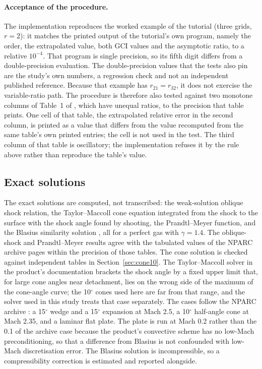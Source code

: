 \documentclass[11pt,a4paper]{article}
\begin{document}
\paragraph{Acceptance of the procedure.}
The implementation reproduces the worked example of the tutorial \citep{nparc_spatial}
(three grids, $r=2$): it matches the printed output of the tutorial's own program, namely the order, the
extrapolated value, both GCI values and the asymptotic ratio, to a relative $10^{-4}$.
That program is single precision, so its fifth digit differs from a double-precision evaluation.
The double-precision values that the tests also pin are the study's own numbers, a regression check and not an
independent published reference.
Because that example has $r_{21}=r_{32}$, it does not exercise the variable-ratio path.
The procedure is therefore also tested against two monotone columns of Table~1 of \citet{celik2008}, which
have unequal ratios, to the precision that table prints.
One cell of that table, the extrapolated relative error in the second column, is printed as a value that
differs from the value recomputed from the same table's own printed entries; the cell is not used in the test.
The third column of that table is oscillatory; the implementation refuses it by the rule above rather than
reproduce the table's value.

\subsection{Exact solutions}
\label{sec:exact}

The exact solutions are computed, not transcribed: the weak-solution oblique shock relation, the
Taylor--Maccoll cone equation integrated from the shock to the surface with the shock angle found by shooting,
the Prandtl--Meyer function, and the Blasius similarity solution \citep{blasius1908,schlichting2017},
all for a perfect gas with $\gamma=1.4$.
The oblique-shock and Prandtl--Meyer results agree with the tabulated values of the NPARC archive pages
\citep{nparc_wedge,nparc_pm15} within the precision of those tables.
The cone solution is checked against independent tables in Section~\ref{sec:cone10}.
The Taylor--Maccoll solver in the product's documentation brackets the shock angle by a fixed upper limit that, for
large cone angles near detachment, lies on the wrong side of the maximum of the cone-angle curve; the 10$^\circ$
cones used here are far from that range, and the solver used in this study treats that case separately.
The cases follow the NPARC archive \citep{nparc_archive}: a 15$^\circ$ wedge and a 15$^\circ$ expansion at Mach 2.5, a 10$^\circ$ half-angle cone at
Mach 2.35, and a laminar flat plate.
The plate is run at Mach 0.2 rather than the 0.1 of the archive case because the product's convective scheme has
no low-Mach preconditioning, so that a difference from Blasius is not confounded with low-Mach discretisation error.
The Blasius solution is incompressible, so a compressibility correction is estimated and reported alongside.
\end{document}
